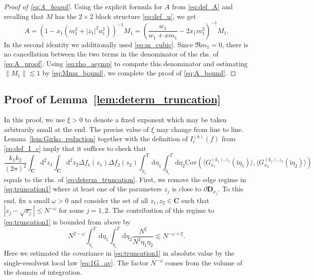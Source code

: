 \documentclass[10pt]{amsart}
\numberwithin{equation}{section}
\newcommand{\dif}{\mathrm{d}}
\newcommand{\C}{\mathbf{C}}
\newcommand{\DD}{\mathbf{D}}
\newcommand{\Cov}{\mathrm{Cov}}
\newcommand{\ii}{\mathrm{i}}
\begin{document}
\begin{proof}[Proof of \eqref{eq:A_bound}] Using the explicit formula for $A$ from \eqref{eq:def_A} and recalling that $M$ has the $2\times 2$ block structure \eqref{eq:def_u}, we get
\begin{equation}
A=\left(1-x_1\left(m_1^2 +|z_1|^2u_1^2\right)\right)^{-1}M_1 = \left(\frac{w_1}{w_1+xm_1} - 2x_1m_1^2\right)^{-1}M_1.
\label{eq:A_proof}
\end{equation}
In the second identity we additionally used \eqref{eq:m_cubic}. Since $\Re m_1=0$, there is no cancellation between the two terms in the denominator of the rhs. of \eqref{eq:A_proof}. Using \eqref{eq:rho_asymp} to compute this denominator and estimating $\|M_1\|\lesssim 1$ by \eqref{eq:Mmu_bound}, we complete the proof of \eqref{eq:A_bound}.
\end{proof}


\subsection{Proof of Lemma~\ref{lem:determ_truncation}}\label{sec:truncation} In this proof, we use $\xi>0$ to denote a fixed exponent which may be taken arbitrarily small at the end. The precise value of $\xi$ may change from line to line. Lemma~\ref{lem:Girko_reduction} together with the definition of $I_c^{(k)}(f)$ from \eqref{eq:def_I_c} imply that it suffices to check that
\begin{equation}
\frac{k_1k_2}{(2\pi)^2} \int_\C \dif^2 z_1\int_\C \dif^2 z_2 \overline{\Delta f_1(z_1)}\Delta f_2(z_2) \int_{\eta_c}^{T}\dif\eta_1\int_{\eta_c}^{T}\dif \eta_2 \Cov\left(\langle G_{x_1}^{(k_1),z_1}(\ii\eta_1)\rangle,\langle G_{x_2}^{(k_2),z_2}(\ii\eta_2)\rangle\right) 
\label{eq:truncation1}
\end{equation} 
equals to the rhs. of \eqref{eq:determ_truncation}. First, we remove the edge regime in \eqref{eq:truncation1} where at least one of the parameters $z_j$ is close to $\partial\DD_{x_j}$. To this end, fix a small $\omega>0$ and consider the set of all $z_1,z_2\in \C$ such that $|z_j-\sqrt{x_j}|\le N^{-\omega}$ for some $j=1,2$. The contribution of this regime to \eqref{eq:truncation1} is bounded from above by
\begin{equation}
N^{2-\omega} \int_{\eta_c}^T\dif\eta_1 \int_{\eta_c}^T \dif \eta_2 \frac{N^\xi}{N^2\eta_1\eta_2} \lesssim N^{-\omega+\xi}.
\label{eq:truncation2}
\end{equation}
Here we estimated the covariance in \eqref{eq:truncation1} in absolute value by the single-resolvent local law \eqref{eq:1G_av}. The factor $N^{-\omega}$ comes from the volume of the domain of integration.
\end{document}
